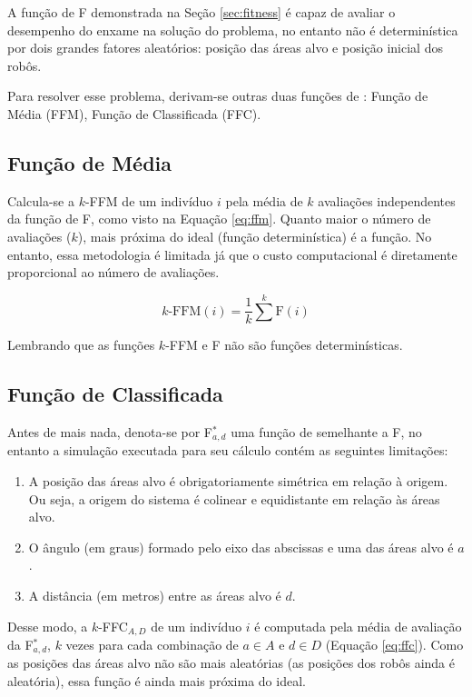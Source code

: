 A função de \fitness F demonstrada na Seção \ref{sec:fitness} é capaz de avaliar o desempenho do enxame na solução do problema, no entanto não é determinística por dois grandes fatores aleatórios: posição das áreas alvo e posição inicial dos robôs.

Para resolver esse problema, derivam-se outras duas funções de \fitness: Função de \fitness Média (FFM), Função de \fitness Classificada (FFC).

\subsection{Função de \fitness Média}

Calcula-se a $k$-FFM de um indivíduo $i$ pela média de $k$ avaliações independentes da função de \fitness F, como visto na Equação \ref{eq:ffm}. Quanto maior o número de avaliações ($k$), mais próxima do ideal (função determinística) é a função. No entanto, essa metodologia é limitada já que o custo computacional é diretamente proporcional ao número de avaliações.

\begin{equation}
\label{eq:ffm}
k\text{-FFM} (i) = \frac{1}{k} \sum^{k} \text{F} (i)
\end{equation}

Lembrando que as funções $k$-FFM e F não são funções determinísticas.

\subsection{Função de \fitness Classificada}

Antes de mais nada, denota-se por F$_{a,d}^{*}$ uma função de \fitness semelhante a F, no entanto a simulação executada para seu cálculo contém as seguintes limitações:

\begin{enumerate}
    \item A posição das áreas alvo é obrigatoriamente simétrica em relação à origem. Ou seja, a origem do sistema é colinear e equidistante em relação às áreas alvo.
    \item O ângulo (em graus) formado pelo eixo das abscissas e uma das áreas alvo é $a$.
    \item A distância (em metros) entre as áreas alvo é $d$.
\end{enumerate}

Desse modo, a $k$-FFC$_{A,D}$ de um indivíduo $i$ é computada pela média de avaliação da F$_{a,d}^{*}$, $k$ vezes para cada combinação de $a \in A$ e $d \in D$ (Equação \ref{eq:ffc}). Como as posições das áreas alvo não são mais aleatórias (as posições dos robôs ainda é aleatória), essa função é ainda mais próxima do ideal.

